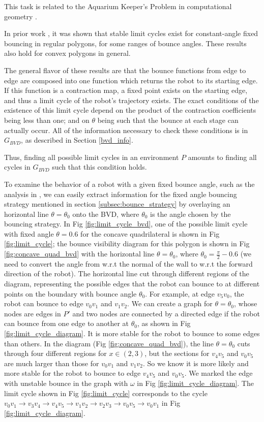 \documentclass[]{styles/svproc}  %
\begin{document}
This task is related to the Aquarium Keeper's Problem in computational
geometry \cite{czyzowicz1991aquarium}.

In prior work \cite{NilBecLav17}, it was shown that stable limit cycles
exist for constant-angle fixed bouncing in regular polygons, for some ranges of bounce angles.
These results also hold for convex polygons in general.

The general flavor of these results are that the bounce functions from edge to
edge are composed into one function which returns the robot to its starting
edge. If this function is a contraction map, a fixed point exists on the
starting edge, and thus a limit cycle of the robot's trajectory exists. The
exact conditions of the existence of this limit cycle depend on the product of
the contraction coefficients being less than one; and on $\theta$ being such
that the bounce at each stage can actually occur. All of the information
necessary to check these conditions is in $G_{BVD}$, as described in Section
\ref{bvd_info}.

Thus, finding all possible limit cycles in an environment $P$ amounts to finding
all cycles in $G_{BVD}$ such that this condition holds.

To examine the behavior of a robot with a given fixed bounce angle, such as the
analysis in \cite{ErLav13}, we can easily extract information for the fixed angle bouncing strategy
mentioned in section \ref{subsec:bounce_strategy} by overlaying an horizontal
line $\theta = \theta_0$ onto the BVD, where $\theta_0$ is the angle chosen by
the bouncing strategy. In Fig \ref{fig:limit_cycle_bvd}, one of the possible
limit cycle with fixed angle $\theta = 0.6$ for the concave quadrilateral is
shown in Fig \ref{fig:limit_cycle}; the bounce visibility diagram for this
polygon is shown in Fig \ref{fig:concave_quad_bvd} with the horizontal line
$\theta = \theta_0$, where $\theta_0 = \frac{\pi}{2}-0.6$ (we need to convert
the angle from w.r.t the normal of the wall to w.r.t the forward direction of
the robot). The horizontal line cut through different regions of the diagram,
representing the possible edges that the robot can bounce to at different points
on the boundary with bounce angle $\theta_0$. For example, at edge $v_5v_0$, the
robot can bounce to edge $v_0v_1$ and $v_1v_2$. We can create a graph for
$\theta = \theta_0$, whose nodes are edges in $P'$ and two nodes are connected
by a directed edge if the robot can bounce from one edge to another at
$\theta_0$, as shown in Fig \ref{fig:limit_cycle_diagram}. It is more stable
for the robot to bounce to some edges than others. In the diagram
(Fig \ref{fig:concave_quad_bvd}), the line $\theta = \theta_0$ cuts through
four different regions for $x \in (2, 3)$, but the sections for $v_4v_5$ and
$v_0v_5$ are much larger than those for $v_0v_1$ and $v_1v_2$. So we know it is
more likely and more stable for the robot to bounce to edge $v_4v_5$ and
$v_0v_5$. We marked the edge with unstable bounce in the graph with $\omega$ in
Fig \ref{fig:limit_cycle_diagram}. The limit cycle shown in
Fig \ref{fig:limit_cycle} corresponds to the cycle
$v_0v_1\rightarrow v_3v_4\rightarrow v_4v_5 \rightarrow v_1v_2 \rightarrow v_2v_3 \rightarrow v_0v_5 \rightarrow v_0v_1$
in Fig \ref{fig:limit_cycle_diagram}.
\end{document}
